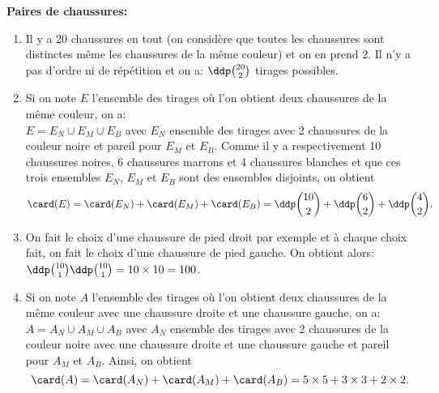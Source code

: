 \documentclass[a4paper, 11pt]{article}
\begin{document}
\begin{correction}  \; \textbf{Paires de chaussures:}
	\begin{enumerate}
		\item Il y a 20 chaussures en tout (on consid\`ere que toutes les chaussures sont distinctes m\^eme les chaussures de la m\^eme couleur) et on en prend 2. Il n'y a pas d'ordre ni de r\'ep\'etition et on a: $\ddp \binom{20}{2}$ tirages possibles.
		\item Si on note $E$ l'ensemble des tirages o\`u l'on obtient deux chaussures de la m\^eme couleur, on a:\\
		      \noindent  $E=E_N\cup E_M\cup E_B$ avec $E_N$ ensemble des tirages avec 2 chaussures de la couleur noire et pareil pour $E_M$ et $E_B$. Comme il y a respectivement 10 chaussures noires, 6 chaussures marrons et 4 chaussures blanches et que ces trois ensembles $E_N$, $E_M$ et $E_B$ sont des ensembles disjoints, on obtient
		      $$\card(E)=\card (E_N)+\card(E_M)+\card(E_B)=\ddp \binom{10}{2}+\ddp \binom{6}{2}+\ddp \binom{4}{2}.$$
		\item On fait le choix d'une chaussure de pied droit par exemple et \`a chaque choix fait, on fait le choix d'une chaussure de pied gauche. On obtient alors: $\ddp \binom{10}{1}\ddp \binom{10}{1}=10\times 10=100$.
		\item Si on note $A$ l'ensemble des tirages o\`u l'on obtient deux chaussures de la m\^eme couleur avec une chaussure droite et une chaussure gauche, on a: $A=A_N\cup A_M\cup A_B$ avec $A_N$ ensemble des tirages avec 2 chaussures de la couleur noire avec une chaussure droite et une chaussure gauche et pareil pour $A_M$ et $A_B$. Ainsi, on obtient
		      $$\card(A)=\card (A_N)+\card(A_M)+\card(A_B)=5\times 5+3\times 3+2\times 2.$$
	\end{enumerate}
\end{correction}



\end{document}

